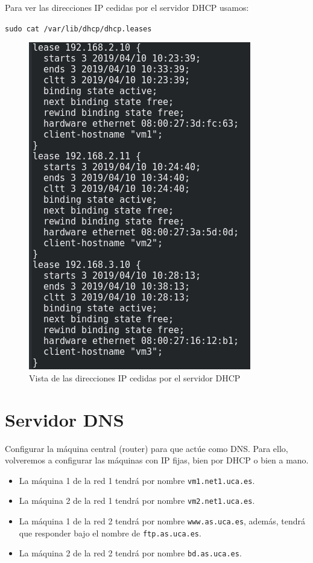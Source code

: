 \documentclass[12pt,letterpaper]{article}
\begin{document}
Para ver las direcciones IP cedidas por el servidor DHCP usamos:
\begin{center}
	\texttt{sudo cat /var/lib/dhcp/dhcp.leases}
\end{center}
\newpage
\begin{figure}[h]
	\centering
	\includegraphics[scale=0.8]{DHCP3.png}
	\caption{Vista de las direcciones IP cedidas por el servidor DHCP}
\end{figure}

\section{Servidor DNS}
Configurar la máquina central (router) para que actúe como DNS. Para ello, volveremos a configurar las máquinas con IP fijas, bien por DHCP o bien a mano.
\begin{itemize}
	\item La máquina 1 de la red 1 tendrá por nombre \texttt{vm1.net1.uca.es}.
	\item La máquina 2 de la red 1 tendrá por nombre \texttt{vm2.net1.uca.es}.
	\item La máquina 1 de la red 2 tendrá por nombre \texttt{www.as.uca.es}, además, tendrá que responder bajo el nombre de \texttt{ftp.as.uca.es}.
	\item La máquina 2 de la red 2 tendrá por nombre \texttt{bd.as.uca.es}.
\end{itemize}
\end{document}

